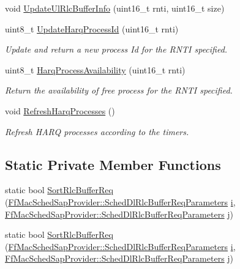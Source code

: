 \begin{DoxyCompactItemize}
\item 
void \hyperlink{classns3_1_1RrFfMacScheduler_afb35721c4c54c4114e5aeb4cf03ff175}{Update\+Ul\+Rlc\+Buffer\+Info} (uint16\+\_\+t rnti, uint16\+\_\+t size)
\item 
uint8\+\_\+t \hyperlink{classns3_1_1RrFfMacScheduler_a4578e84d57b9602408f7a3af95ef152c}{Update\+Harq\+Process\+Id} (uint16\+\_\+t rnti)
\begin{DoxyCompactList}\small\item\em Update and return a new process Id for the R\+N\+TI specified. \end{DoxyCompactList}\item 
uint8\+\_\+t \hyperlink{classns3_1_1RrFfMacScheduler_af764ce5bbe2c2e0843064779816f1bc0}{Harq\+Process\+Availability} (uint16\+\_\+t rnti)
\begin{DoxyCompactList}\small\item\em Return the availability of free process for the R\+N\+TI specified. \end{DoxyCompactList}\item 
void \hyperlink{classns3_1_1RrFfMacScheduler_a8489330ad94640e0d432db6f11156d43}{Refresh\+Harq\+Processes} ()
\begin{DoxyCompactList}\small\item\em Refresh H\+A\+RQ processes according to the timers. \end{DoxyCompactList}\end{DoxyCompactItemize}
\subsection*{Static Private Member Functions}
\begin{DoxyCompactItemize}
\item 
static bool \hyperlink{classns3_1_1RrFfMacScheduler_a834409ab0fff37d33390f6c2bec6a3bb}{Sort\+Rlc\+Buffer\+Req} (\hyperlink{structns3_1_1FfMacSchedSapProvider_1_1SchedDlRlcBufferReqParameters}{Ff\+Mac\+Sched\+Sap\+Provider\+::\+Sched\+Dl\+Rlc\+Buffer\+Req\+Parameters} \hyperlink{lte__uplink__power__control_8m_a6f6ccfcf58b31cb6412107d9d5281426}{i}, \hyperlink{structns3_1_1FfMacSchedSapProvider_1_1SchedDlRlcBufferReqParameters}{Ff\+Mac\+Sched\+Sap\+Provider\+::\+Sched\+Dl\+Rlc\+Buffer\+Req\+Parameters} j)
\item 
static bool \hyperlink{classns3_1_1RrFfMacScheduler_a266884a6fa72fc2c89a4421f7703c869}{Sort\+Rlc\+Buffer\+Req} (\hyperlink{structns3_1_1FfMacSchedSapProvider_1_1SchedDlRlcBufferReqParameters}{Ff\+Mac\+Sched\+Sap\+Provider\+::\+Sched\+Dl\+Rlc\+Buffer\+Req\+Parameters} \hyperlink{lte__uplink__power__control_8m_a6f6ccfcf58b31cb6412107d9d5281426}{i}, \hyperlink{structns3_1_1FfMacSchedSapProvider_1_1SchedDlRlcBufferReqParameters}{Ff\+Mac\+Sched\+Sap\+Provider\+::\+Sched\+Dl\+Rlc\+Buffer\+Req\+Parameters} j)
\end{DoxyCompactItemize}
